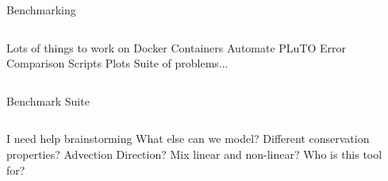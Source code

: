 \begin{frame}{Benchmarking}
\begin{columns}
\centering
\begin{outline}
  \1 Lots of things to work on
  \1 Docker Containers
  \1 Automate PLuTO
  \1 Error Comparison Scripts 
  \1 Plots
  \1 Suite of problems... 
\end{outline}

\begin{center}
\centering


\end{center}
\end{columns}
\end{frame}

\begin{frame}{Benchmark Suite}
\begin{columns}
\centering
\begin{outline}
  \1 I need help brainstorming
  \1 What else can we model?
  \2 Different conservation properties?
  \2 Advection Direction?
  \2 Mix linear and non-linear?
  \1 Who is this tool for?
\end{outline}

\begin{center}
\centering


\end{center}
\end{columns}
\end{frame}
